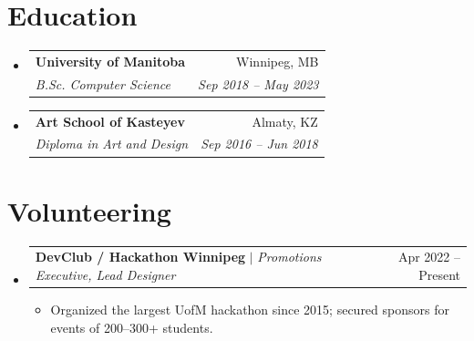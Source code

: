 \documentclass[letterpaper,11pt]{article}
\makeatletter
\newcommand{\resumeItem}[1]{
  \item\small{
    {#1 \vspace{-2pt}}
  }
}
\newcommand{\resumeSubheading}[4]{
  \vspace{-2pt}\item
    \begin{tabular*}{0.97\textwidth}[t]{l@{\extracolsep{\fill}}r}
      \textbf{#1} & #2 \\
      \textit{\small#3} & \textit{\small #4} \\
    \end{tabular*}\vspace{-7pt}
}
\newcommand{\resumeProjectHeading}[2]{
    \item
    \begin{tabular*}{0.97\textwidth}{l@{\extracolsep{\fill}}r}
      \small#1 & #2 \\
    \end{tabular*}\vspace{-7pt}
}
\newcommand{\resumeSubHeadingListStart}{\begin{itemize}[leftmargin=0.15in, label={}]}
\newcommand{\resumeSubHeadingListEnd}{\end{itemize}}
\newcommand{\resumeItemListStart}{\begin{itemize}}
\newcommand{\resumeItemListEnd}{\end{itemize}\vspace{-5pt}}
\makeatother
\begin{document}
\section{Education}
  \resumeSubHeadingListStart
    \resumeSubheading
      {University of Manitoba}{Winnipeg, MB}
      {B.Sc. Computer Science}{Sep 2018 -- May 2023}
    \resumeSubheading
      {Art School of Kasteyev}{Almaty, KZ}
      {Diploma in Art and Design}{Sep 2016 -- Jun 2018}
  \resumeSubHeadingListEnd

\section{Volunteering}
    \resumeSubHeadingListStart
      \resumeProjectHeading
          {\textbf{DevClub / Hackathon Winnipeg} $|$ \emph{Promotions Executive, Lead Designer}}{Apr 2022 -- Present}
          \resumeItemListStart
            \resumeItem{Organized the largest UofM hackathon since 2015; secured sponsors for events of 200--300+ students.}
          \resumeItemListEnd
    \resumeSubHeadingListEnd
\end{document}
